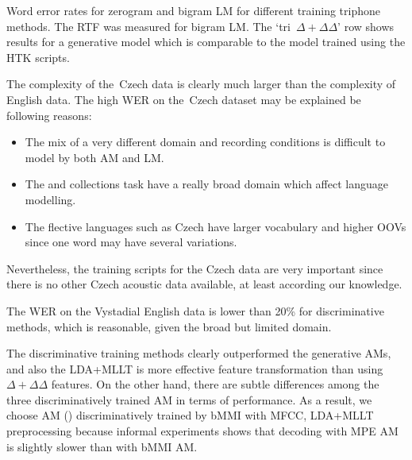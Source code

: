 \begin{table}[h]

\caption{Word error rates for zerogram and bigram LM for different training triphone methods.
    The RTF was measured for bigram \ac{LM}.
    The `tri~$\Delta+\Delta\Delta$' row shows results for a generative model which is comparable to the model trained using the HTK scripts.
}
\label{tab:best}
\end{table}

The complexity of the~Czech data is clearly much larger than the complexity of English data.
The high \ac{WER} on the~Czech dataset may be explained be following reasons:
\begin{itemize}
    \item The mix of a very different domain and recording conditions is difficult to model by both \ac{AM} and \ac{LM}. 
    \item The  and  collections task have a really broad domain which affect language modelling.
    \item The flective languages such as Czech have larger vocabulary and higher \acp{OOV} since one word may have several variations.
\end{itemize}
Nevertheless, the training scripts for the Czech data are very important since there is no other Czech acoustic data available, at least according our knowledge.

The \ac{WER} on the Vystadial English data is lower than 20\% for discriminative methods, which is reasonable, given the broad but limited domain.

The discriminative training methods clearly outperformed the generative \acp{AM}, and also the \ac{LDA}+\ac{MLLT} is more effective feature transformation than using $\Delta+\Delta\Delta$ features.
On the other hand, there are subtle differences among the three discriminatively trained \ac{AM} in terms of performance.
As a result, we choose \ac{AM} () discriminatively trained by \ac{bMMI} with \ac{MFCC}, \ac{LDA}+\ac{MLLT} preprocessing because informal experiments shows that decoding with \ac{MPE} \acl{AM} is slightly slower than with \ac{bMMI} \ac{AM}. 


